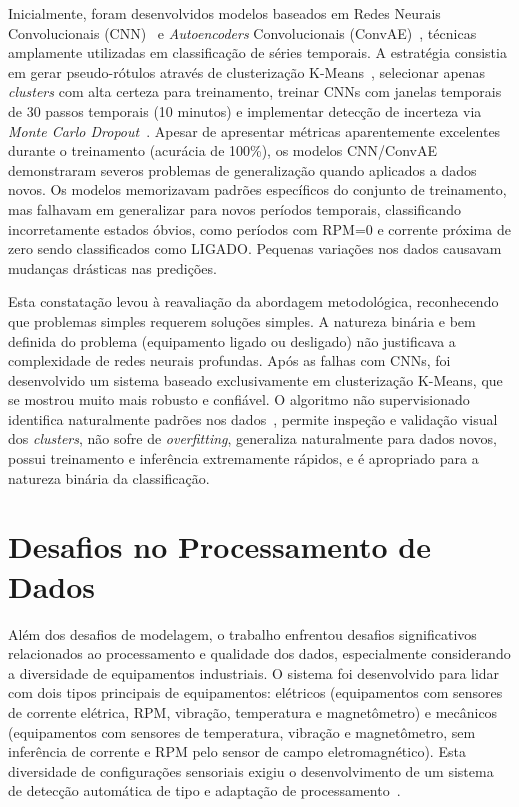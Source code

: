 Inicialmente, foram desenvolvidos modelos baseados em Redes Neurais Convolucionais (CNN)~\cite{li2025hybrid} e \textit{Autoencoders} Convolucionais (ConvAE)~\cite{tziolas2022autoencoders}, técnicas amplamente utilizadas em classificação de séries temporais. A estratégia consistia em gerar pseudo-rótulos através de clusterização K-Means~\cite{zhao2023hybrid}, selecionar apenas \textit{clusters} com alta certeza para treinamento, treinar CNNs com janelas temporais de 30 passos temporais (10 minutos) e implementar detecção de incerteza via \textit{Monte Carlo Dropout}~\cite{gal2016dropout}. Apesar de apresentar métricas aparentemente excelentes durante o treinamento (acurácia de 100\%), os modelos CNN/ConvAE demonstraram severos problemas de generalização quando aplicados a dados novos. Os modelos memorizavam padrões específicos do conjunto de treinamento, mas falhavam em generalizar para novos períodos temporais, classificando incorretamente estados óbvios, como períodos com RPM=0 e corrente próxima de zero sendo classificados como LIGADO. Pequenas variações nos dados causavam mudanças drásticas nas predições.

Esta constatação levou à reavaliação da abordagem metodológica, reconhecendo que problemas simples requerem soluções simples. A natureza binária e bem definida do problema (equipamento ligado ou desligado) não justificava a complexidade de redes neurais profundas. Após as falhas com CNNs, foi desenvolvido um sistema baseado exclusivamente em clusterização K-Means, que se mostrou muito mais robusto e confiável. O algoritmo não supervisionado identifica naturalmente padrões nos dados~\cite{habib2015outliers}, permite inspeção e validação visual dos \textit{clusters}, não sofre de \textit{overfitting}, generaliza naturalmente para dados novos, possui treinamento e inferência extremamente rápidos, e é apropriado para a natureza binária da classificação.

\section{Desafios no Processamento de Dados}

Além dos desafios de modelagem, o trabalho enfrentou desafios significativos relacionados ao processamento e qualidade dos dados, especialmente considerando a diversidade de equipamentos industriais. O sistema foi desenvolvido para lidar com dois tipos principais de equipamentos: elétricos (equipamentos com sensores de corrente elétrica, RPM, vibração, temperatura e magnetômetro) e mecânicos (equipamentos com sensores de temperatura, vibração e magnetômetro, sem inferência de corrente e RPM pelo sensor de campo eletromagnético). Esta diversidade de configurações sensoriais exigiu o desenvolvimento de um sistema de detecção automática de tipo e adaptação de processamento~\cite{osornio2023data}.

